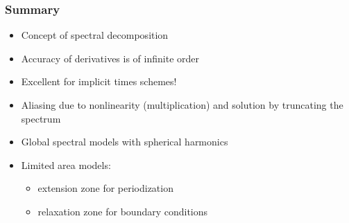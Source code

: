 \documentclass[aspectratio=43,9pt]{beamer}
\begin{document}
%
%
\begin{frame}
	\frametitle{Summary}
	\vfill\begin{itemize}
		\item Concept of spectral decomposition\vfill
		\item Accuracy of derivatives is of infinite order\vfill
		\item Excellent for implicit times schemes!\vfill
		\item Aliasing due to nonlinearity (multiplication) and solution by truncating the spectrum\vfill
		\item Global spectral models with spherical harmonics\vfill
		\item Limited area models:
			\begin{itemize}
				\item extension zone for periodization
				\item relaxation zone for boundary conditions
			\end{itemize}
	\end{itemize}\vfill
\end{frame}
%
%
\end{document}
